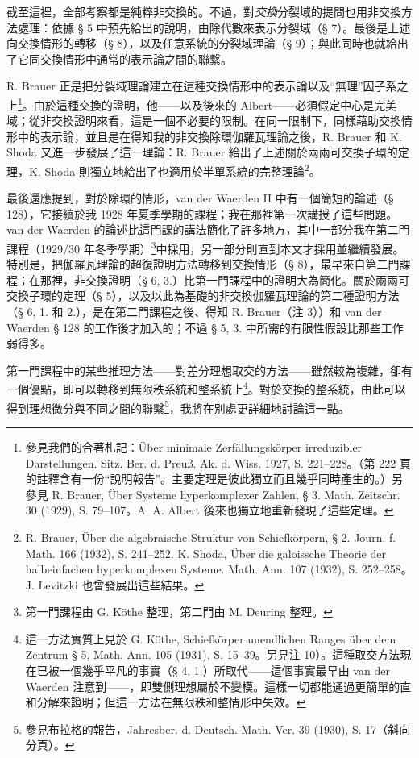 \documentclass[11pt]{article}
\begin{document}
截至這裡，全部考察都是純粹非交換的。不過，對\emph{交換}分裂域的提問也用非交換方法處理：依據 § 5 中預先給出的說明，由除代數來表示分裂域（§ 7）。最後是上述向交換情形的轉移（§ 8），以及任意系統的分裂域理論（§ 9）；與此同時也就給出了它同交換情形中通常的表示論之間的聯繫。

R. Brauer 正是把分裂域理論建立在這種交換情形中的表示論以及“無理”因子系之上\footnote{參見我們的合著札記：Über minimale Zerfällungskörper irreduzibler Darstellungen. Sitz. Ber. d. Preuß. Ak. d. Wiss. 1927, S. 221--228。（第 222 頁的註釋含有一份“說明報告”。主要定理是彼此獨立而且幾乎同時產生的。）另參見 R. Brauer, Über Systeme hyperkomplexer Zahlen, § 3. Math. Zeitschr. 30 (1929), S. 79--107。A. A. Albert 後來也獨立地重新發現了這些定理。}。由於這種交換的證明，他——以及後來的 Albert——必須假定中心是完美域；從非交換證明來看，這是一個不必要的限制。在同一限制下，同樣藉助交換情形中的表示論，並且是在得知我的非交換除環伽羅瓦理論之後，R. Brauer 和 K. Shoda 又進一步發展了這一理論：R. Brauer 給出了上述關於兩兩可交換子環的定理，K. Shoda 則獨立地給出了也適用於半單系統的完整理論\footnote{R. Brauer, Über die algebraische Struktur von Schiefkörpern, § 2. Journ. f. Math. 166 (1932), S. 241--252. K. Shoda, Über die galoissche Theorie der halbeinfachen hyperkomplexen Systeme. Math. Ann. 107 (1932), S. 252--258。J. Levitzki 也曾發展出這些結果。}。

最後還應提到，對於除環的情形，van der Waerden II 中有一個簡短的論述（§ 128），它接續於我 1928 年夏季學期的課程；我在那裡第一次講授了這些問題。van der Waerden 的論述比這門課的講法簡化了許多地方，其中一部分我在第二門課程（1929/30 年冬季學期）\footnote{第一門課程由 G. Köthe 整理，第二門由 M. Deuring 整理。}中採用，另一部分則直到本文才採用並繼續發展。特別是，把伽羅瓦理論的超復證明方法轉移到交換情形（§ 8），最早來自第二門課程；在那裡，非交換證明（§ 6, 3.）比第一門課程中的證明大為簡化。關於兩兩可交換子環的定理（§ 5），以及以此為基礎的非交換伽羅瓦理論的第二種證明方法（§ 6, 1. 和 2.），是在第二門課程之後、得知 R. Brauer（注 3））和 van der Waerden § 128 的工作後才加入的；不過 § 5, 3. 中所需的有限性假設比那些工作弱得多。

第一門課程中的某些推理方法——對差分理想取交的方法——雖然較為複雜，卻有一個優點，即可以轉移到無限秩系統和整系統上\footnote{這一方法實質上見於 G. Köthe, Schiefkörper unendlichen Ranges über dem Zentrum § 5, Math. Ann. 105 (1931), S. 15--39。另見注 10）。這種取交方法現在已被一個幾乎平凡的事實（§ 4, 1.）所取代——這個事實最早由 van der Waerden 注意到——，即雙側理想屬於不變模。這樣一切都能通過更簡單的直和分解來證明；但這一方法在無限秩和整情形中失效。}。對於交換的整系統，由此可以得到理想微分與不同之間的聯繫\footnote{參見布拉格的報告，Jahresber. d. Deutsch. Math. Ver. 39 (1930), S. 17（斜向分頁）。}，我將在別處更詳細地討論這一點。
\end{document}
